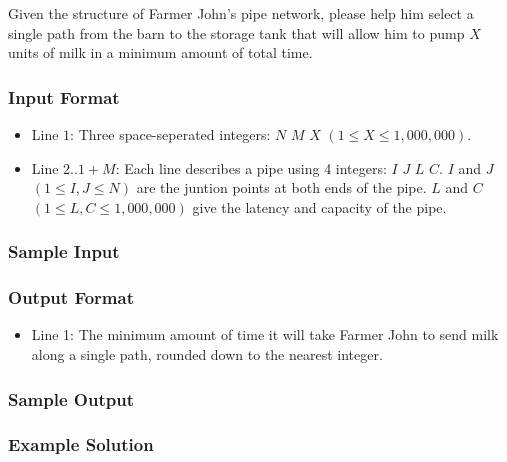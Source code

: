 Given the structure of Farmer John's pipe network, please help him select a single path from the barn to the storage tank that will allow him to pump $X$ units
of milk in a minimum amount of total time.

\subsubsection{Input Format}
\begin{itemize}
	\item Line $1$: Three space-seperated integers: $N$ $M$ $X$ $(1 \leq X \leq 1,000,000)$.
	\item Line $2..1+M$: Each line describes a pipe using 4 integers: $I$ $J$ $L$ $C$.
			$I$ and $J$ $(1 \leq I,J \leq N)$ are the juntion points at both ends of the pipe.
			$L$ and $C$ $(1 \leq L,C \leq 1,000,000)$ give the latency and capacity of the pipe.
\end{itemize}

\subsubsection{Sample Input}

\subsubsection{Output Format}
\begin{itemize}
	\item Line 1: The minimum amount of time it will take Farmer John to send milk along a single path, 
			rounded down to the nearest integer.
\end{itemize}

\subsubsection{Sample Output}

\subsubsection{Example Solution}

